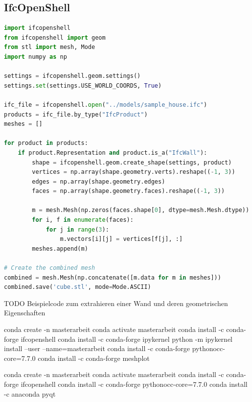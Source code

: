 \subsection{IfcOpenShell}
\begin{lstlisting}[language=Python, caption=Beispielprogrammcode um bestimmte Daten aus einem IFC File zu laden und daraus ein Mesh zu generieren]
import ifcopenshell
from ifcopenshell import geom
from stl import mesh, Mode
import numpy as np

settings = ifcopenshell.geom.settings()
settings.set(settings.USE_WORLD_COORDS, True)

ifc_file = ifcopenshell.open("../models/sample_house.ifc")
products = ifc_file.by_type("IfcProduct")
meshes = []

for product in products:
    if product.Representation and product.is_a("IfcWall"):
        shape = ifcopenshell.geom.create_shape(settings, product)
        vertices = np.array(shape.geometry.verts).reshape((-1, 3))
        edges = np.array(shape.geometry.edges)
        faces = np.array(shape.geometry.faces).reshape((-1, 3))

        m = mesh.Mesh(np.zeros(faces.shape[0], dtype=mesh.Mesh.dtype))
        for i, f in enumerate(faces):
            for j in range(3):
                m.vectors[i][j] = vertices[f[j], :]
        meshes.append(m)

# Create the combined mesh
combined = mesh.Mesh(np.concatenate([m.data for m in meshes]))
combined.save('cube.stl', mode=Mode.ASCII)
\end{lstlisting}
TODO Beispielcode zum extrahieren einer Wand und deren geometrischen Eigenschaften

conda create -n masterarbeit
conda activate masterarbeit
conda install -c conda-forge ifcopenshell
conda install -c conda-forge ipykernel
python -m ipykernel install --user --name=masterarbeit
conda install -c conda-forge pythonocc-core=7.7.0
conda install -c conda-forge meshplot 

conda create -n masterarbeit
conda activate masterarbeit
conda install -c conda-forge ifcopenshell
conda install -c conda-forge pythonocc-core=7.7.0
conda install -c anaconda pyqt 

